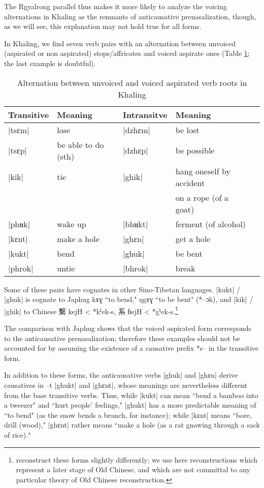 \documentclass[oldfontcommands,oneside,a4paper,11pt]{article}
\newcommand{\ipa}[1]{{\phon #1}} %
\newcommand{\zh}[1]{{\cn #1}}
\newcommand{\dhatu}[1]{|\ipa{#1}|}
\begin{document}
The Rgyalrong parallel thus makes it more likely to analyze the voicing alternations in Khaling as the remnants of anticausative prenasalization, though, as we will see, this explanation may not hold true for all forms.


In Khaling, we find seven verb pairs with an alternation between unvoiced (aspirated or non aspirated) stops/affricates and voiced aspirate ones (Table \ref{tab:anticaus}; the last example is doubtful).

\begin{table}[H]
\caption{Alternation between unvoiced and voiced aspirated verb roots in Khaling} \label{tab:anticaus}
\begin{tabular}{lllll}
\toprule
Transitive & Meaning &Intransitve& Meaning \\
\midrule
\dhatu{tsɛm} & lose & \dhatu{dzhɛm} &be lost \\
\dhatu{tsɛp} & be able to do (sth) & \dhatu{dzhɛp} &be possible \\
\dhatu{kik} & tie & \dhatu{ghik} &  hang oneself by accident\\
&&& on a rope (of a goat) \\
\dhatu{phʉk} & wake up & \dhatu{bhʉkt} &ferment (of alcohol) \\
\midrule
\dhatu{kɛnt} & make a hole & \dhatu{ghɛn} &get a hole \\
\dhatu{kukt} & bend & \dhatu{ghuk} &be bent\\
\midrule
\dhatu{phrok} & untie & \dhatu{bhrok} &break \\
\bottomrule
\end{tabular}
\end{table}
Some of these pairs have cognates in other Sino-Tibetan languages. \dhatu{kukt} / \dhatu{ghuk} is cognate to Japhug \ipa{kɤɣ} ``to bend," \ipa{ŋgɤɣ} ``to be bent" (*--ɔk), and \dhatu{kik} / \dhatu{ghik} to Chinese \zh{繫} \ipa{kejH} < *\ipa{kˁek-s}, \zh{系} \ipa{ɦejH} < *\ipa{gˁek-s}.\footnote{\citet{bs14oc} reconstruct these forms slightly differently; we use here  reconstructions which represent  a later stage of Old Chinese, and which are not committal to any particular theory of Old Chinese reconstruction.}

The comparison with Japhug shows that the voiced aspirated form corresponds to the anticausative prenasalization; therefore these examples should not be accounted for by assuming the existence of a causative prefix *s-- in the transitive form.

In addition to these forms, the anticausative verbs \dhatu{ghuk} and \dhatu{ghɛn} derive causatives in \ipa{--t} \dhatu{ghukt} and \dhatu{ghɛnt}, whose meanings are nevertheless different from the base transitive verbs. Thus, while \dhatu{kukt} can mean ``bend a bamboo into a tweezer" and ``hurt people' feelings," \dhatu{ghukt} has a more predictable meaning of ``to bend" (as the snow bends a branch, for instance); while \dhatu{kɛnt} means ``bore, drill (wood)," \dhatu{ghɛnt} rather means ``make a hole (as a rat gnawing through a sack of rice)."
\end{document}
